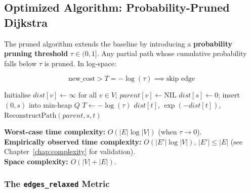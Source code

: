 \subsection{Optimized Algorithm: Probability-Pruned Dijkstra}

The pruned algorithm extends the baseline by introducing a \textbf{probability pruning threshold} $\tau \in (0, 1]$. Any partial path whose cumulative probability falls below $\tau$ is pruned. In log-space:

\[
\text{new\_cost} > T = -\log(\tau) \implies \text{skip edge}
\]

\begin{algorithm}[H]
\caption{Probability-Pruned Dijkstra}\label{alg:pruned}
\SetAlgoLined
\KwIn{Graph $G=(V,E)$, source $s$, target $t$, pruning threshold $\tau \in (0,1]$}
Initialise $\mathit{dist}[v] \leftarrow \infty$ for all $v \in V$; $\mathit{parent}[v] \leftarrow \mathrm{NIL}$\;
$\mathit{dist}[s] \leftarrow 0$; insert $(0, s)$ into min-heap $Q$\;
$T \leftarrow -\log(\tau)$
\Return $\mathit{dist}[t]$, $\exp(-\mathit{dist}[t])$, $\mathrm{ReconstructPath}(\mathit{parent}, s, t)$\;
\end{algorithm}

\noindent\textbf{Worst-case time complexity:} $O(|E| \log |V|)$ (when $\tau \to 0$).\\
\textbf{Empirically observed time complexity:} $O(|E'| \log |V|)$, $|E'| \leq |E|$ (see Chapter~\ref{chap:complexity} for validation).\\
\textbf{Space complexity:} $O(|V| + |E|)$.

\subsubsection{The \texttt{edges\_relaxed} Metric}

